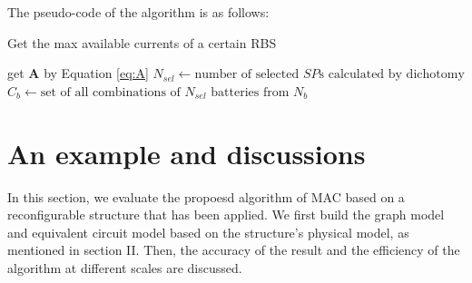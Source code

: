 \documentclass{article}
\begin{document}
The pseudo-code of the algorithm is as follows:
\begin{algorithm}
    \caption{Get the max available currents of a certain RBS}\label{alg:eta_RBS}
    \KwResult{$\max \eta$}
    get $\bm{A}$ by Equation \ref{eq:A}\;
        {
            $N_{sel} \leftarrow \text{number of selected $SP$s calculated by dichotomy}$\;
            $C_b    \leftarrow \text{set of all combinations of $N_{sel} $~batteries from $N_b$}$\;
        }
\end{algorithm}

\section{An example and discussions}
In this section, we evaluate the propoesd algorithm of MAC based on a reconfigurable structure \cite{visairoReconfigurableBatteryPack2008} that has been applied.
We first build the graph model and equivalent circuit model based on the structure's physical model, as mentioned in section II.
Then, the accuracy of the result and the efficiency of the algorithm at different scales are discussed.
\end{document}
